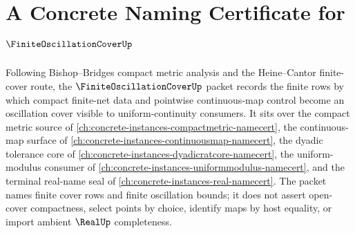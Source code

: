 \chapter{A Concrete Naming Certificate for $\FiniteOscillationCoverUp$}
\label{ch:concrete-instances-finite-oscillation-cover-namecert}

Following Bishop--Bridges compact metric analysis and the Heine--Cantor finite-cover route, the $\FiniteOscillationCoverUp$ packet records the finite rows by which compact finite-net data and pointwise continuous-map control become an oscillation cover visible to uniform-continuity consumers. It sits over the compact metric source of \autoref{ch:concrete-instances-compactmetric-namecert}, the continuous-map surface of \autoref{ch:concrete-instances-continuousmap-namecert}, the dyadic tolerance core of \autoref{ch:concrete-instances-dyadicratcore-namecert}, the uniform-modulus consumer of \autoref{ch:concrete-instances-uniformmodulus-namecert}, and the terminal real-name seal of \autoref{ch:concrete-instances-real-namecert}. The packet names finite cover rows and finite oscillation bounds; it does not assert open-cover compactness, select points by choice, identify maps by host equality, or import ambient $\RealUp$ completeness.

